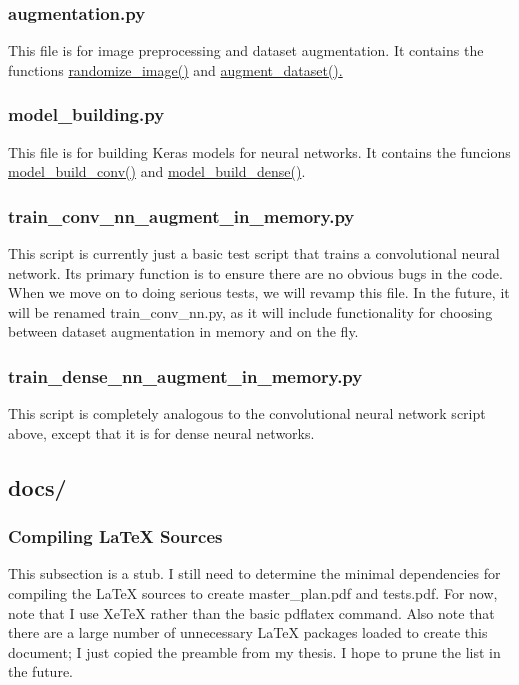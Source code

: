 \subsubsection{{\ttfamily augmentation.py}}
This file is for image preprocessing and dataset augmentation. It contains the functions \hyperref[randimg]{{\ttfamily randomize\_image()}} and \hyperref[augdata]{{\ttfamily augment\_dataset()}.}
\subsubsection{{\ttfamily model\_building.py}}
This file is for building Keras models for neural networks. It contains the funcions \hyperref[mdlbldconv]{{\ttfamily model\_build\_conv()}} and \hyperref[mdlblddense]{{\ttfamily model\_build\_dense()}}.
\subsubsection{{\ttfamily train\_conv\_nn\_augment\_in\_memory.py}}
This script is currently just a basic test script that trains a convolutional neural network. Its primary function is to ensure there are no obvious bugs in the code. When we move on to doing serious tests, we will revamp this file. In the future, it will be renamed {\ttfamily train\_conv\_nn.py}, as it will include functionality for choosing between dataset augmentation in memory and on the fly.
\subsubsection{{\ttfamily train\_dense\_nn\_augment\_in\_memory.py}}
This script is completely analogous to the convolutional neural network script above, except that it is for dense neural networks.
\subsection{{\ttfamily docs/}}
\subsubsection{Compiling LaTeX Sources}
This subsection is a stub. I still need to determine the minimal dependencies for compiling the LaTeX sources to create {\ttfamily master\_plan.pdf} and {\ttfamily tests.pdf}. For now, note that I use XeTeX rather than the basic {\ttfamily pdflatex} command. Also note that there are a large number of unnecessary LaTeX packages loaded to create this document; I just copied the preamble from my thesis. I hope to prune the list in the future.
